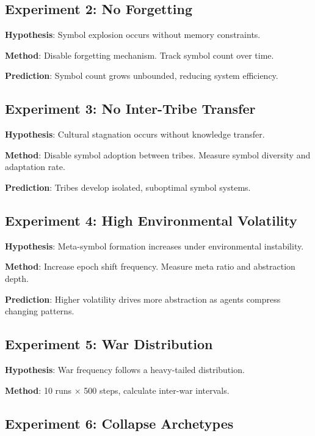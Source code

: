 \documentclass[11pt,a4paper]{article}
\begin{document}
\subsection{Experiment 2: No Forgetting}

\textbf{Hypothesis}: Symbol explosion occurs without memory constraints.

\textbf{Method}: Disable forgetting mechanism. Track symbol count over time.

\textbf{Prediction}: Symbol count grows unbounded, reducing system efficiency.

\subsection{Experiment 3: No Inter-Tribe Transfer}

\textbf{Hypothesis}: Cultural stagnation occurs without knowledge transfer.

\textbf{Method}: Disable symbol adoption between tribes. Measure symbol diversity and adaptation rate.

\textbf{Prediction}: Tribes develop isolated, suboptimal symbol systems.

\subsection{Experiment 4: High Environmental Volatility}

\textbf{Hypothesis}: Meta-symbol formation increases under environmental instability.

\textbf{Method}: Increase epoch shift frequency. Measure meta ratio and abstraction depth.

\textbf{Prediction}: Higher volatility drives more abstraction as agents compress changing patterns.

\subsection{Experiment 5: War Distribution}

\textbf{Hypothesis}: War frequency follows a heavy-tailed distribution.

\textbf{Method}: 10 runs $\times$ 500 steps, calculate inter-war intervals.

\subsection{Experiment 6: Collapse Archetypes}
\end{document}
